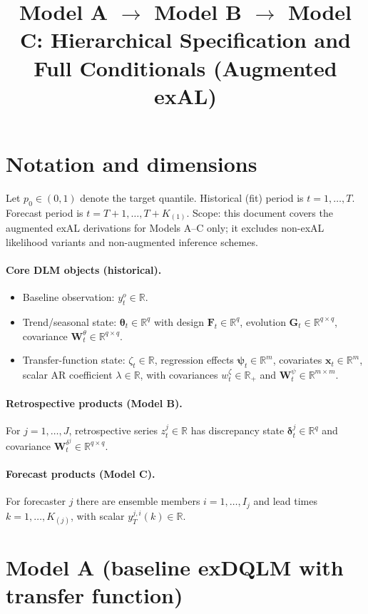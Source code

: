 \documentclass[11pt]{article}
\title{Model A $\to$ Model B $\to$ Model C: Hierarchical Specification and Full Conditionals (Augmented exAL)}
\date{}
\newcommand{\R}{\mathbb{R}}
\newcommand{\1}{\mathbb{I}}
\begin{document}
\maketitle

\section{Notation and dimensions}

Let $p_0\in(0,1)$ denote the target quantile. Historical (fit) period is $t=1,\dots,T$. Forecast period is $t=T+1,\dots,T+K_{(1)}$.
Scope: this document covers the augmented exAL derivations for Models A--C only; it excludes non-exAL likelihood variants and non-augmented inference schemes.

\paragraph{Core DLM objects (historical).}
\begin{itemize}
\item Baseline observation: $y_t^o\in\R$.
\item Trend/seasonal state: $\bm\theta_t\in\R^q$ with design $\bm F_t\in\R^q$, evolution $\bm G_t\in\R^{q\times q}$, covariance $\bm W_t^\theta\in\R^{q\times q}$.
\item Transfer-function state: $\zeta_t\in\R$, regression effects $\bm\psi_t\in\R^m$, covariates $\bm x_t\in\R^m$, scalar AR coefficient $\lambda\in\R$, with covariances $w_t^\zeta\in\R_+$ and $\bm W_t^\psi\in\R^{m\times m}$.
\end{itemize}

\paragraph{Retrospective products (Model B).}
For $j=1,\dots,J$, retrospective series $z_t^j\in\R$ has  discrepancy state $\bm\delta_t^j\in\R^q$ and covariance $\bm W_t^{\delta^j}\in\R^{q\times q}$.

\paragraph{Forecast products (Model C).}
For forecaster $j$ there are ensemble members $i=1,\dots,I_j$ and lead times $k=1,\dots,K_{(j)}$, with scalar $y_T^{j,i}(k)\in\R$.

\section{Model A (baseline exDQLM with transfer function)}
\end{document}
